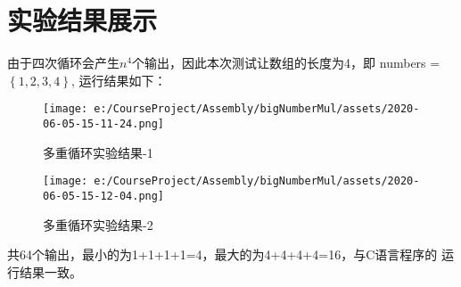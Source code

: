 \section{实验结果展示}

由于四次循环会产生$n^4$个输出，因此本次测试让数组的长度为4，即
numbers = $\left\{1, 2, 3, 4\right\}$, 运行结果如下：

\begin{figure}[H]
    \centering
    \texttt{[image: e:/CourseProject/Assembly/bigNumberMul/assets/2020-06-05-15-11-24.png]}
    \caption{多重循环实验结果-1}
    \label{多重循环实验结果-1}
\end{figure}

\begin{figure}[H]
    \centering
    \texttt{[image: e:/CourseProject/Assembly/bigNumberMul/assets/2020-06-05-15-12-04.png]}
    \caption{多重循环实验结果-2}
    \label{多重循环实验结果-2}
\end{figure}

共64个输出，最小的为1+1+1+1=4，最大的为4+4+4+4=16，与C语言程序的
运行结果一致。
